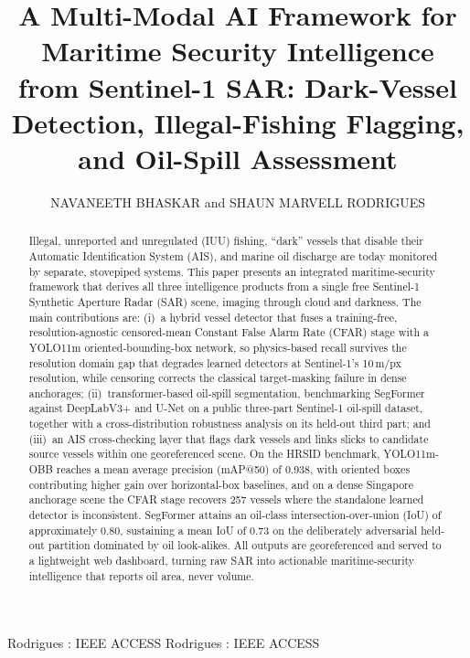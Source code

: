 \documentclass{ieeeaccess}
\begin{document}

\title{A Multi-Modal AI Framework for Maritime Security Intelligence from Sentinel-1 SAR: Dark-Vessel Detection, Illegal-Fishing Flagging, and Oil-Spill Assessment}

\author{\uppercase{Navaneeth Bhaskar} and \uppercase{Shaun Marvell Rodrigues}}

\address[1]{Nitte (Deemed to be University), NMAM Institute of Technology (NMAMIT), Nitte, Karnataka, India }


\markboth
{Rodrigues \headeretal: IEEE ACCESS}
{Rodrigues \headeretal: IEEE ACCESS}



\begin{abstract}
Illegal, unreported and unregulated (IUU) fishing, ``dark'' vessels that disable their Automatic Identification System (AIS), and marine oil discharge are today monitored by separate, stovepiped systems. This paper presents an integrated maritime-security framework that derives all three intelligence products from a single free Sentinel-1 Synthetic Aperture Radar (SAR) scene, imaging through cloud and darkness. The main contributions are: (i)~a hybrid vessel detector that fuses a training-free, resolution-agnostic censored-mean Constant False Alarm Rate (CFAR) stage with a YOLO11m oriented-bounding-box network, so physics-based recall survives the resolution domain gap that degrades learned detectors at Sentinel-1's 10\,m/px resolution, while censoring corrects the classical target-masking failure in dense anchorages; (ii)~transformer-based oil-spill segmentation, benchmarking SegFormer against DeepLabV3+ and U-Net on a public three-part Sentinel-1 oil-spill dataset, together with a cross-distribution robustness analysis on its held-out third part; and (iii)~an AIS cross-checking layer that flags dark vessels and links slicks to candidate source vessels within one georeferenced scene. On the HRSID benchmark, YOLO11m-OBB reaches a mean average precision (mAP@50) of 0.938, with oriented boxes contributing higher gain over horizontal-box baselines, and on a dense Singapore anchorage scene the CFAR stage recovers 257 vessels where the standalone learned detector is inconsistent. SegFormer attains an oil-class intersection-over-union (IoU) of approximately 0.80, sustaining a mean IoU of 0.73 on the deliberately adversarial held-out partition dominated by oil look-alikes. All outputs are georeferenced and served to a lightweight web dashboard, turning raw SAR into actionable maritime-security intelligence that reports oil area, never volume.
\end{abstract}
\end{document}
